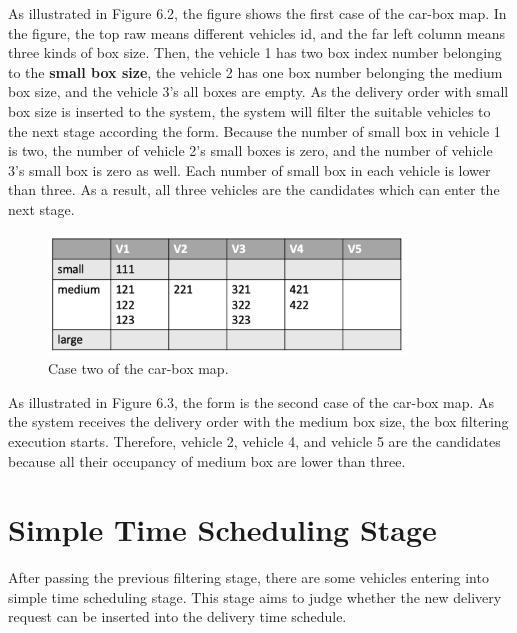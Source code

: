 \documentclass[12pt]{ksthesis}
\begin{document}
\begin{thesis}
{As illustrated in Figure 6.2, the figure shows the first case of the car-box map. In the figure, the top raw means different vehicles id, and the far left column means three kinds of box size. Then, the vehicle 1 has two box index number belonging to the \textbf{small box size}, the vehicle 2 has one box number belonging the medium box size, and the vehicle 3’s all boxes are empty.
As the delivery order with small box size is inserted to the system, the system will filter the suitable vehicles to the next stage according the form. Because the number of small box in vehicle 1 is two, the number of vehicle 2’s small boxes is zero, and the number of vehicle 3’s small box is zero as well. Each number of small box in each vehicle is lower than three. As a result, all three vehicles are the candidates which can enter the next stage.

\begin{figure}[t]
\centering
\includegraphics[width=0.85\textwidth]{./Thesis_figures/F6-3_caseTwo_boxFiltering.PNG}
\caption{\large Case two of the car-box map.}
\vspace{0.5cm}
\label{Fig:CaseTwo_carBox_Map}
\end{figure}

As illustrated in Figure 6.3, the form is the second case of the car-box map. As the system receives the delivery order with the medium box size, the box filtering execution starts. Therefore, vehicle 2, vehicle 4, and vehicle 5 are the candidates because all their occupancy of medium box are lower than three.

\section{Simple Time Scheduling Stage}

After passing the previous filtering stage, there are some vehicles entering into simple time scheduling stage. This stage aims to judge whether the new delivery request can be inserted into the delivery time schedule.

}
\end{thesis}
\end{document}
